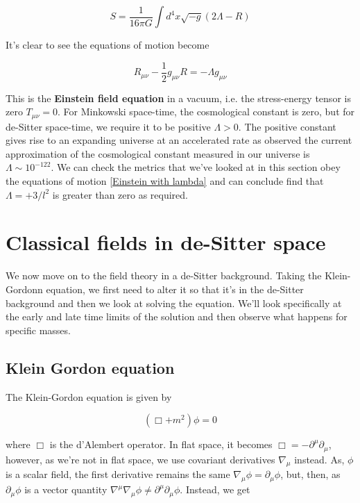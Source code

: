 \documentclass[a4paper,11pt]{article}
\numberwithin{equation}{section}
\numberwithin{figure}{section}
\begin{document}
\begin{large}
\begin{equation}
\label{new action}
    S=\frac{1}{16\pi G} \int d^4x \sqrt{-g} (2\Lambda-R)
\end{equation}

It's clear to see the equations of motion become

\begin{equation}
\label{Einstein with lambda}
    R_{\mu \nu}-\frac{1}{2}g_{\mu \nu} R=-\Lambda g_{\mu \nu}
\end{equation}

This is the \textbf{Einstein field equation} in a vacuum, i.e. the stress-energy tensor is zero $T_{\mu \nu}=0$. For Minkowski space-time, the cosmological constant is zero, but for de-Sitter space-time, we require it to be positive $\Lambda>0$. The positive constant gives rise to an expanding universe at an accelerated rate as observed \cite{cosmoconst,cosmoval} the current approximation of the cosmological constant measured in our universe is $\Lambda \sim 10^{-122}$. We can check the metrics that we've looked at in this section obey the equations of motion \eqref{Einstein with lambda} and can conclude find that $\Lambda=+3/l^2$ is greater than zero as required.

\newpage

\section{\Large Classical fields in de-Sitter space}

We now move on to the field theory in a de-Sitter background. Taking the Klein-Gordonn equation, we first need to alter it so that it's in the de-Sitter background and then we look at solving the equation. We'll look specifically at the early and late time limits of the solution and then observe what happens for specific masses.


\subsection{Klein Gordon equation}

The Klein-Gordon equation is given by 

\begin{equation}
\label{Klein Gordon}    
    (\Box+m^2)\phi=0
\end{equation}

where $\Box$ is the d'Alembert operator. In flat space, it becomes $\Box=-\partial^\mu\partial_\mu$, however, as we're not in flat space, we use covariant derivatives $\nabla_\mu$ instead. As, $\phi$ is a scalar field, the first derivative remains the same $\nabla_\mu\phi=\partial_\mu\phi$, but, then, as $\partial_\mu\phi$ is a vector quantity $\nabla^\mu\nabla_\mu\phi \neq \partial^\mu \partial_\mu\phi$. Instead, we get


\end{large}
\end{document}
